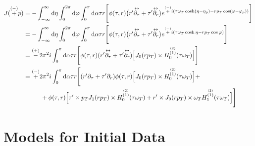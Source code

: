 \begin{subequations}
    \begin{align}
        J(\overset{(-)}{+}p) & =-\int_{-\infty}^\infty\text{d}\eta\int_0^{2\pi}\text{d}\varphi\int_0^\pi\text{d}\alpha\tau r\Bigg[\phi(\tau,r)\big(r^\prime\overset{\leftrightarrow}{\partial_\tau}+\tau^\prime\overset{\leftrightarrow}{\partial_r}\big)e^{\overset{(-)}{+}{i}(\tau \omega_T\cosh(\eta-\eta_p)-r p_T\cos(\varphi-\varphi_p))}\Bigg] \\
                           & =-\int_{-\infty}^\infty\text{d}\eta\int_0^{2\pi}\text{d}\varphi\int_0^\pi\text{d}\alpha\tau r\Bigg[\phi(\tau,r)\big(r^\prime\overset{\leftrightarrow}{\partial_\tau}+\tau^\prime\overset{\leftrightarrow}{\partial_r}\big)e^{\overset{(-)}{+}{i}(\tau \omega_T\cosh\eta-r p_T\cos\varphi)}\Bigg]                      \\
                           & =\overset{(+)}{-}2\pi^2{i}\int_0^\pi\text{d}\alpha\tau r\Bigg[\phi(\tau,r)(r^\prime\overset{\leftrightarrow}{\partial_\tau}+\tau^\prime\overset{\leftrightarrow}{\partial_r})\Big[J_0(r p_T)\times H_0^{\overset{(2)}{(1)}}(\tau\omega_T)\Big]\Bigg]                                                 \\
                           & =\overset{(-)}{+}2\pi^2{i}\int_0^\pi\text{d}\alpha\tau r\Bigg[(r^\prime\partial_\tau+\tau^\prime\partial_r)\phi(\tau,r)\Big[J_0(r p_T)\times H_0^{\overset{(2)}{(1)}}(\tau\omega_T)\Big]+\nonumber                                                                                             \\
                           & \phantom{=}\qquad + \phi(\tau,r)\Big[\tau^\prime\times p_T J_1(r p_T)\times H_0^{\overset{(2)}{(1)}}(\tau\omega_T)+r^\prime\times J_0(r p_T)\times\omega_T H_1^{\overset{(2)}{(1)}}(\tau\omega_T)\Big]\Bigg]
    \end{align}
\end{subequations}



\section{Models for Initial Data}

